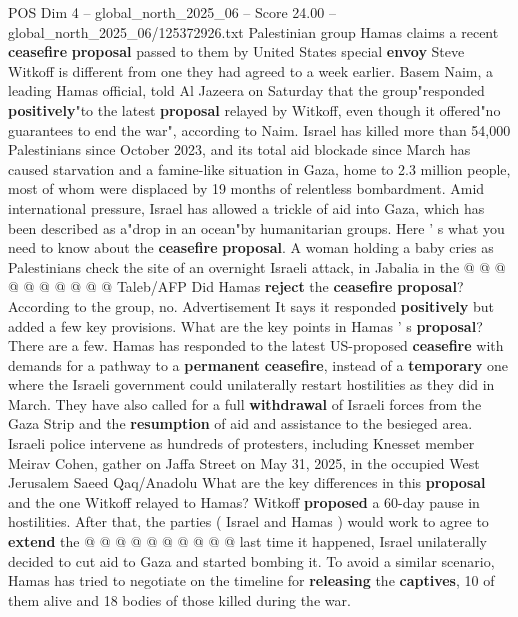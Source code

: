 \begin{textsample}{POS Dim 4 – global\_north\_2025\_06 – Score 24.00 – global\_north\_2025\_06/125372926.txt}  \label{ex:f4_pos_391}
Palestinian group Hamas claims a recent \textbf{ceasefire} \textbf{proposal} passed to them by United States special \textbf{envoy} Steve Witkoff is different from one they had agreed to a week earlier.
Basem Naim, a leading Hamas official, told Al Jazeera on Saturday that the group"responded \textbf{positively}"to the latest \textbf{proposal} relayed by Witkoff, even though it offered"no guarantees to end the war", according to Naim.
Israel has killed more than 54,000 Palestinians since October 2023, and its total aid blockade since March has caused starvation and a famine-like situation in Gaza, home to 2.3 million people, most of whom were displaced by 19 months of relentless bombardment.
Amid international pressure, Israel has allowed a trickle of aid into Gaza, which has been described as a"drop in an ocean"by humanitarian groups.
Here ' s what you need to know about the \textbf{ceasefire} \textbf{proposal}.
A woman holding a baby cries as Palestinians check the site of an overnight Israeli attack, in Jabalia in the @ @ @ @ @ @ @ @ @ @ Taleb/AFP Did Hamas \textbf{reject} the \textbf{ceasefire} \textbf{proposal}?
According to the group, no.
Advertisement It says it responded \textbf{positively} but added a few key provisions.
What are the key points in Hamas ' s \textbf{proposal}?
There are a few.
Hamas has responded to the latest US-proposed \textbf{ceasefire} with demands for a pathway to a \textbf{permanent} \textbf{ceasefire}, instead of a \textbf{temporary} one where the Israeli government could unilaterally restart hostilities as they did in March.
They have also called for a full \textbf{withdrawal} of Israeli forces from the Gaza Strip and the \textbf{resumption} of aid and assistance to the besieged area.
Israeli police intervene as hundreds of protesters, including Knesset member Meirav Cohen, gather on Jaffa Street on May 31, 2025, in the occupied West Jerusalem Saeed Qaq/Anadolu What are the key differences in this \textbf{proposal} and the one Witkoff relayed to Hamas?
Witkoff \textbf{proposed} a 60-day pause in hostilities.
After that, the parties ( Israel and Hamas ) would work to agree to \textbf{extend} the @ @ @ @ @ @ @ @ @ @ last time it happened, Israel unilaterally decided to cut aid to Gaza and started bombing it.
To avoid a similar scenario, Hamas has tried to negotiate on the timeline for \textbf{releasing} the \textbf{captives}, 10 of them alive and 18 bodies of those killed during the war.

\end{textsample}
